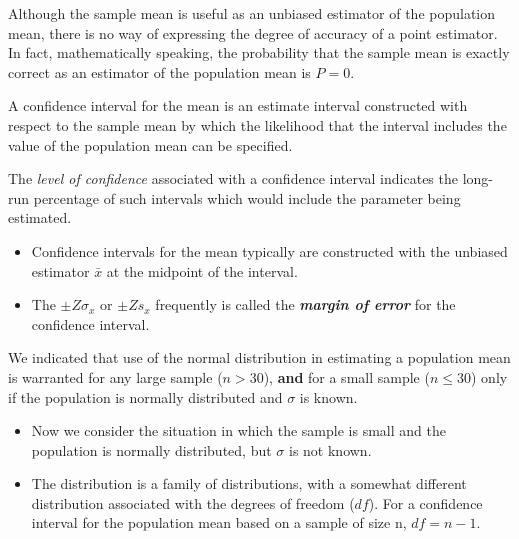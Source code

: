 \begin{frame}
Although the sample mean is useful as an unbiased estimator of the population mean, there is no way of
expressing the degree of accuracy of a point estimator. In fact, mathematically speaking, the probability that the
sample mean is exactly correct as an estimator of the population mean is $P = 0$.
\end{frame}
\begin{frame}
A confidence interval for the
mean is an estimate interval constructed with respect to the sample mean by which the likelihood that the interval
includes the value of the population mean can be specified.

The \emph{level of confidence} associated with a confidence interval indicates the long-run percentage
 of such intervals which would include the parameter being estimated.
\end{frame}
\begin{frame}
\begin{itemize}
\item Confidence intervals for the mean typically are constructed with the unbiased estimator $\bar{x}$ at the midpoint
of the interval.

\item The $\pm Z \sigma_x$ or $\pm Z s_x$ frequently is called the \textbf{\emph{margin of error}} for the confidence interval.
\end{itemize}
\end{frame}
\begin{frame}
We indicated that use of the normal distribution in estimating a population mean is warranted
for any large sample ($n > 30$), \textbf{and} for a small sample ($n \leq 30$) only if the population is normally distributed
and $\sigma$ is known.
\end{frame}
\begin{frame}
\begin{itemize}
\item Now we consider the situation in which the sample is small and the population is normally distributed,
but $\sigma$ is not known.
\item The distribution is a family of distributions, with
a somewhat different distribution associated with the degrees of freedom ($df$). For a confidence interval for the
population mean based on a sample of size n, $df = n - 1$.
\end{itemize}
\end{frame}

